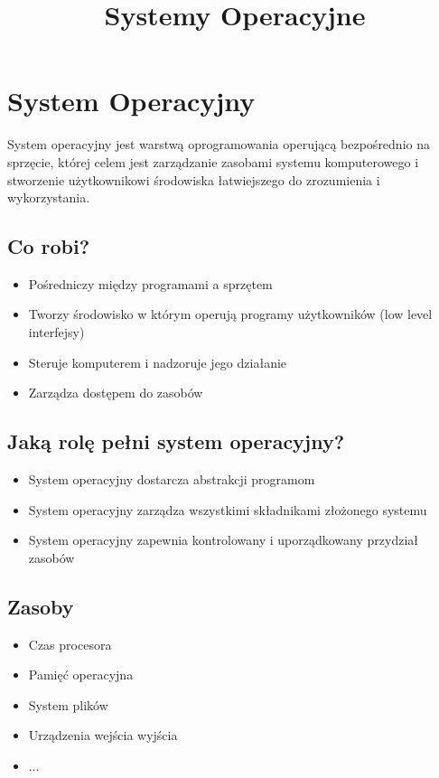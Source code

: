 \documentclass{../notatki}
\title{Systemy Operacyjne}
\begin{document}
\tableofcontents

\section{System Operacyjny}

System operacyjny jest warstwą oprogramowania operującą bezpośrednio
na sprzęcie, której celem jest zarządzanie zasobami systemu
komputerowego i stworzenie użytkownikowi środowiska łatwiejszego do
zrozumienia i wykorzystania.

\subsection{Co robi?}

\begin{itemize}
  \item Pośredniczy między programami a sprzętem
  \item Tworzy środowisko w którym operują programy użytkowników (low
    level interfejsy)
  \item Steruje komputerem i nadzoruje jego działanie
  \item Zarządza dostępem do zasobów
\end{itemize}

\subsection{Jaką rolę pełni system operacyjny?}

\begin{itemize}
  \item System operacyjny dostarcza abstrakcji programom
  \item System operacyjny zarządza wszystkimi składnikami złożonego systemu
  \item System operacyjny zapewnia kontrolowany i uporządkowany
    przydział zasobów
\end{itemize}

\subsection{Zasoby}

\begin{itemize}
  \item Czas procesora
  \item Pamięć operacyjna
  \item System plików
  \item Urządzenia wejścia wyjścia
  \item $\dots$
\end{itemize}
\end{document}
